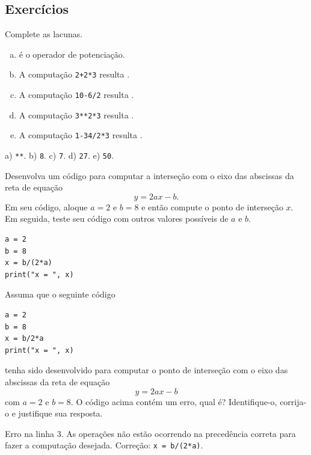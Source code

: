 \subsection{Exercícios}

\begin{exer}
  Complete as lacunas.
  \begin{enumerate}[a)]
    \item \underline{\phantom{\texttt{**}}} é o operador de potenciação.
    \item A computação \texttt{2+2*3} resulta \underline{}.
    \item A computação \texttt{10-6/2} resulta \underline{}.
    \item A computação \texttt{3**2*3} resulta \underline{}.
    \item A computação \texttt{1-34/2*3} resulta \underline{}.
  \end{enumerate}
\end{exer}
\begin{resp}
  a) \texttt{**}. b) \texttt{8}. c) \texttt{7}. d) \texttt{27}. e) \texttt{50}.
\end{resp}

\begin{exer}
  Desenvolva um código {\python} para computar a interseção com o eixo das abscissas da reta de equação
  \begin{equation}
    y =  2ax - b.
  \end{equation}
  Em seu código, aloque $a=2$ e $b=8$ e então compute o ponto de interseção $x$. Em seguida, teste seu código com outros valores possíveis de $a$ e $b$.
\end{exer}
\begin{resp}

\begin{lstlisting}
a = 2
b = 8
x = b/(2*a)
print("x = ", x)
\end{lstlisting}

\end{resp}

\begin{exer}
  Assuma que o seguinte código {\python}

\begin{lstlisting}
a = 2
b = 8
x = b/2*a
print("x = ", x)
\end{lstlisting}

tenha sido desenvolvido para computar o ponto de interseção com o eixo das abscissas da reta de equação
  \begin{equation}
    y = 2ax - b
  \end{equation}
  com $a=2$ e $b=8$. O código acima contém um erro, qual é? Identifique-o, corrija-o e justifique sua resposta.
\end{exer}
\begin{resp}
  Erro na linha 3. As operações não estão ocorrendo na precedência correta para fazer a computação desejada. Correção: \lstinline+x = b/(2*a)+.
\end{resp}

